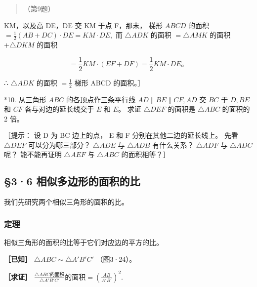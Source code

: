 \begin{quote}
（第9题）
\end{quote}

KM，以及高 DE，DE 交 KM 于点 F，那末， 梯形 \(ABCD\) 的面积
\(= \frac{1}{2} (AB + DC) \cdot DE = KM \cdot DE,\) 而 \(\triangle ADK\)
的面积 \(= \triangle AMK\) 的面积 \(+\triangle DKM\) 的面积

\[
= \frac{1}{2}KM\cdot(EF+DF) = \frac{1}{2}KM\cdot DE\text{。}
\]

∴ \(\triangle ADK\) 的面积 \(=\frac{1}{2}\) 梯形 ABCD 的面积。］

*10. 从三角形 \(ABC\) 的各顶点作三条平行线
\(AD \parallel BE \parallel CF, AD\) 交 \(BC\) 于 \(D, BE\) 和 \(CF\)
各与对边的延长线交于 \(E\) 和 \(E\)。 求证 \(\triangle DEF\) 的面积是
\(\triangle ABC\) 的面积的 2 倍。

［提示： 设 D 为 BC 边上的点， E 和 F 分别在其他二边的延长线上。 先看
\(\triangle DEF\) 可以分为哪三部分？ \(\triangle ADE\) 与
\(\triangle ADB\) 有什么关系？ \(\triangle ADF\) 与 \(\triangle ADC\)
呢？ 能不能再证明 \(\triangle AEF\) 与 \(\triangle ABC\) 的面积相等？］

\subsection{§3·6
相似多边形的面积的比}

我们先研究两个相似三角形的面积的比。

\subsubsection{定理}

相似三角形的面积的比等于它们对应边的平方的比。

\textbf{［已知］} \(\triangle ABC \sim \triangle A'B'C'\) （图3·24）。

\textbf{［求证］}
\(\frac{\triangle ABC\text{的面积}}{\triangle A'B'C'}\text{的面积} = \left(\frac{AB}{A'B'}\right)^2.\)

